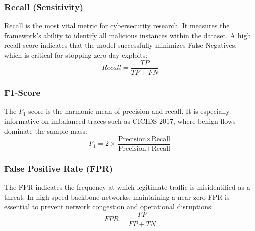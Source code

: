 \documentclass[10pt, conference, compsocconf, letterpaper, twocolumn, twoside]{IEEEtran}
\begin{document}
\subsubsection{Recall (Sensitivity)}
Recall is the most vital metric for cybersecurity research. It measures the framework's ability to identify all malicious instances within the dataset. A high recall score indicates that the model successfully minimizes False Negatives, which is critical for stopping zero-day exploits:
\begin{equation}
Recall = \frac{TP}{TP + FN}
\end{equation}

\subsubsection{F1-Score}
The $F_1$-score is the harmonic mean of precision and recall. It is especially informative on imbalanced traces such as CICIDS-2017, where benign flows dominate the sample mass:
\begin{equation}
F_1 = 2 \times \frac{\text{Precision} \times \text{Recall}}{\text{Precision} + \text{Recall}}
\end{equation}

\subsubsection{False Positive Rate (FPR)}
The FPR indicates the frequency at which legitimate traffic is misidentified as a threat. In high-speed backbone networks, maintaining a near-zero FPR is essential to prevent network congestion and operational disruptions:
\begin{equation}
FPR = \frac{FP}{FP + TN}
\end{equation}
\end{document}
